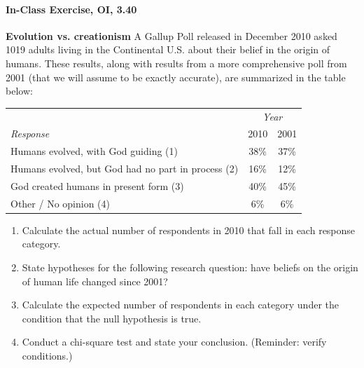 \documentclass[10pt]{article}\usepackage[]{graphicx}\usepackage[]{color}
\begin{document}
\newpage

\paragraph{In-Class Exercise, OI, 3.40}

\textbf{Evolution vs. creationism} A Gallup Poll released in December 2010 asked 1019 adults living in the Continental U.S. about their belief in the origin of humans. These results, along with results from a more comprehensive poll from 2001 (that we will assume to be exactly accurate), are summarized in the table below: 
\begin{center}
\begin{tabular}{l c c}
  										& \multicolumn{2}{c}{\textit{Year}} \\
\cline{2-3}
\textit{Response}								& 2010	& 2001 \\
\hline
Humans evolved, with God guiding (1)				& 38\% 	& 37\% \\
Humans evolved, but God had no part in process (2) 	& 16\% 	& 12\% \\
God created humans  in present form (3) 				& 40\% 	& 45\% \\
Other / No opinion (4)							& 6\% 	& 6\% \\
\hline
\end{tabular}
\end{center} 

\begin{enumerate}
  \itemsep1.5in
\item Calculate the actual number of respondents in 2010 that fall in each response category.
\item State hypotheses for the following research question: have beliefs on the origin of human life changed since 2001?
\item Calculate the expected number of respondents in each category under the condition that the null hypothesis is true.
\item Conduct a chi-square test and state your conclusion. (Reminder: verify conditions.)
\end{enumerate}
\end{document}
